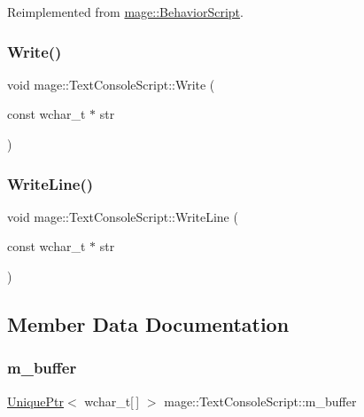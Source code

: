Reimplemented from \hyperlink{classmage_1_1_behavior_script_afb9cf3759edf8876416d1df85489cba6}{mage\+::\+Behavior\+Script}.

\hypertarget{classmage_1_1_text_console_script_a659586a498f8ff0f55aa2a3f25f0828b}{}\label{classmage_1_1_text_console_script_a659586a498f8ff0f55aa2a3f25f0828b} 
\subsubsection{\texorpdfstring{Write()}{Write()}}
{\footnotesize\ttfamily void mage\+::\+Text\+Console\+Script\+::\+Write (\begin{DoxyParamCaption}\item[{const wchar\+\_\+t $\ast$}]{str }\end{DoxyParamCaption})}

\hypertarget{classmage_1_1_text_console_script_a24fe33795c69e70d07a680826cfafcc1}{}\label{classmage_1_1_text_console_script_a24fe33795c69e70d07a680826cfafcc1} 
\subsubsection{\texorpdfstring{Write\+Line()}{WriteLine()}}
{\footnotesize\ttfamily void mage\+::\+Text\+Console\+Script\+::\+Write\+Line (\begin{DoxyParamCaption}\item[{const wchar\+\_\+t $\ast$}]{str }\end{DoxyParamCaption})}



\subsection{Member Data Documentation}
\hypertarget{classmage_1_1_text_console_script_a526410b1b43646948809b772c5446346}{}\label{classmage_1_1_text_console_script_a526410b1b43646948809b772c5446346} 
\subsubsection{\texorpdfstring{m\+\_\+buffer}{m\_buffer}}
{\footnotesize\ttfamily \hyperlink{namespacemage_a3316d7143a973e37adf1110f2e80ca31}{Unique\+Ptr}$<$ wchar\+\_\+t\mbox{[}$\,$\mbox{]} $>$ mage\+::\+Text\+Console\+Script\+::m\+\_\+buffer\hspace{0.3cm}{\ttfamily [private]}}

